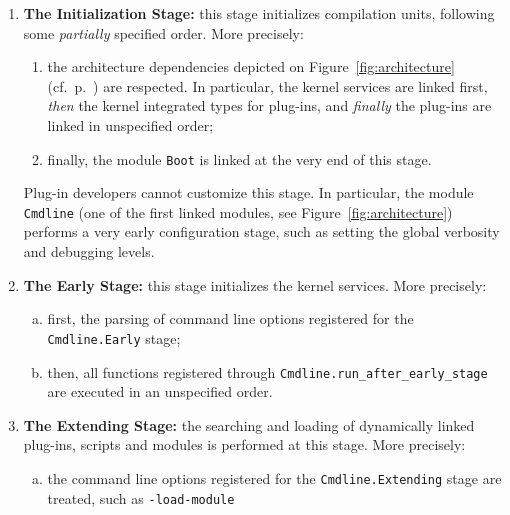 \begin{enumerate}[A --]

\item \textbf{The Initialization Stage:} this stage
  initializes \framac compilation units, following some \emph{partially}
  specified order. More precisely:
  \begin{enumerate}[1.]
  \item the architecture dependencies depicted on
    Figure~\ref{fig:architecture} (cf.~p.~\pageref{archi:general}) are
    respected. In particular, the kernel services are linked first,
    \emph{then} the kernel integrated types for plug-ins, and
    \emph{finally} the plug-ins are linked in unspecified order;
  \item finally, the module \texttt{Boot} is linked at the
    very end of this stage.
  \end{enumerate}

  Plug-in developers cannot customize this stage. In particular, the module
  \texttt{Cmdline} (one of the first linked modules, see
  Figure~\ref{fig:architecture}) performs a very early configuration stage,
  such as setting the global verbosity and debugging levels.

\item \label{stage:early} \textbf{The Early Stage:} this stage initializes the
  kernel services. More precisely:
  \begin{enumerate}[(a)]
  \item first, the parsing of command line options registered for the
    \texttt{Cmdline.Early} stage;
  \item then, all functions registered through
    \texttt{Cmdline.run\_after\_early\_stage}%
     are executed in an
    unspecified order.
  \end{enumerate}

\item \label{stage:extending} \textbf{The Extending Stage:} the searching and
  loading of dynamically linked plug-ins, scripts and
  modules is performed at this stage. More precisely:

  \begin{enumerate}[(a)]
  \item the command line options registered for the
    \texttt{Cmdline.Extending} stage
    are treated, such as \texttt{-load-module}


\end{enumerate}
\end{enumerate}
